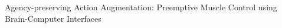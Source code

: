 









Agency-preserving Action Augmentation: Preemptive Muscle Control using Brain-Computer
Interfaces


